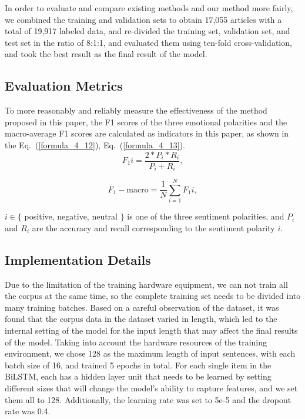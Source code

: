 In order to evaluate and compare existing methods and our method more fairly, we combined the training and validation sets to obtain 17,055 articles with a total of 19,917 labeled data, and re-divided the training set, validation set, and test set in the ratio of 8:1:1, and evaluated them using ten-fold cross-validation, and took the best result as the final result of the model.

\subsection{Evaluation Metrics}

To more reasonably and reliably measure the effectiveness of the method proposed in this paper, the F1 scores of the three emotional polarities and the macro-average F1 scores are calculated as indicators in this paper, as shown in the Eq.~(\ref{formula_4_12}), Eq.~(\ref{formula_4_13}).
\begin{equation}
    F_1i=\frac{2 * P_i * R_i}{P_i+R_i},
    \label{formula_4_12}
\end{equation}

\begin{equation}
    F_1-{\text{macro}}=\frac{1}{N} \sum_{i=1}^N F_1i,
    \label{formula_4_13}
\end{equation}

$i \in\{$ positive, negative, neutral $\}$ is one of the three sentiment polarities, and $P_i$ and $R_i$ are the accuracy and recall corresponding to the sentiment polarity $i$.

\subsection{Implementation Details}

Due to the limitation of the training hardware equipment, we can not train all the corpus at the same time, so the complete training set needs to be divided into many training batches. Based on a careful observation of the dataset, it was found that the corpus data in the dataset varied in length, which led to the internal setting of the model for the input length that may affect the final results of the model. Taking into account the hardware resources of the training environment, we chose 128 as the maximum length of input sentences, with each batch size of 16, and trained 5 epochs in total. For each single item in the BiLSTM, each has a hidden layer unit that needs to be learned by setting different sizes that will change the model's ability to capture features, and we set them all to 128. Additionally, the learning rate was set to 5e-5 and the dropout rate was 0.4.


